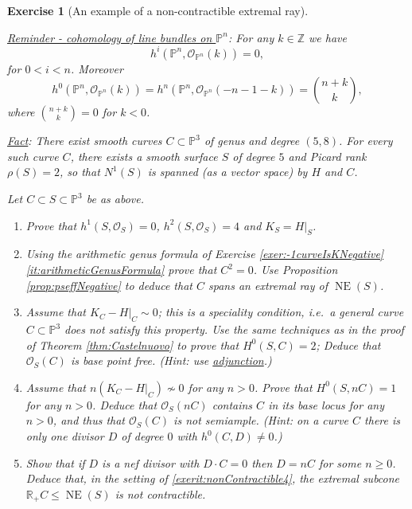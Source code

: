 \documentclass[a4paper,11pt]{amsart}
\newtheorem{exercise}[theorem]{Exercise}
\def\NE{\operatorname{NE}}
\newcommand{\OO}{\mathcal{O}}
\newcommand{\ZZ}{\mathbb{Z}}
\newcommand{\RR}{\mathbb{R}}
\newcommand{\PP}{\mathbb{P}}
\begin{document}
\begin{exercise}[An example of a non-contractible extremal ray]\label{exer:nonSemiample}\leavevmode	
	\begin{center}
		\begin{minipage}{.9\textwidth}
			{\underline{Reminder - \emph{cohomology of line bundles on $\PP^n$}}}:
			For any $k\in \ZZ$ we have
			\[
			h^i(\PP^n,\OO_{\PP^n}(k)) = 0,
			\]
			for $0<i<n$.
			Moreover 
			\[
			h^0(\PP^n,\OO_{\PP^n}(k))= h^n(\PP^n,\OO_{\PP^n}(-n-1-k)) = \binom{n+k}{k},
			\] 
			where $\binom{n+k}{k} = 0$ for $k<0$.
		\end{minipage}
	\end{center}
	\begin{center}
		\begin{minipage}{.9\textwidth}
			{\underline{Fact}}:
			There exist smooth curves $C \subset \PP^3$ of genus and degree $(5,8)$.
			For every such curve $C$, there exists a smooth surface $S$ of degree $5$ and Picard rank $\rho(S) = 2$, so that $N^1(S)$ is spanned (as a vector space) by $H$ and $C$.
		\end{minipage}
	\end{center}
	
	Let $C \subset S \subset \PP^3$ be as above.
	\begin{enumerate}
		\item Prove that $h^1(S,\OO_S) = 0$, $h^2(S,\OO_S) = 4$ and $K_S = H|_S$.
		\item Using the arithmetic genus formula of Exercise \ref{exer:-1curveIsKNegative}\eqref{it:arithmeticGenusFormula} prove that $C^2 = 0$.
		Use Proposition \ref{prop:pseffNegative} to deduce that $C$ spans an extremal ray of $\NE(S)$.
		
		\item Assume that $K_C - H|_C \sim 0$; this is a speciality condition, i.e.\ a general curve $C \subset \PP^3$ does not satisfy this property.
		Use the same techniques as in the proof of Theorem \ref{thm:Castelnuovo} to prove that $H^0(S,C) = 2$;
		Deduce that $\OO_S(C)$ is base point free.
		{\small (Hint: use \hyperref[rem:adjunction]{adjunction}.)}
		\item\label{exerit:nonContractible4} Assume that $n(K_C - H|_C) \not\sim 0$ for any $n > 0$.
		Prove that $H^0(S,nC) = 1$ for any $n > 0$.
		Deduce that $\OO_S(nC)$ contains $C$ in its base locus for any $n>0$, and thus that $\OO_S(C)$ is not semiample.
		{\small (Hint: on a curve $C$ there is only one divisor $D$ of degree $0$ with $h^0(C,D)\neq 0$.)}		
		\item Show that if $D$ is a nef divisor with $D\cdot C = 0$ then $D = nC$ for some $n \geq 0$.
		Deduce that, in the setting of \eqref{exerit:nonContractible4}, the extremal subcone $\RR_+ C \leq \NE(S)$ is \emph{not contractible}.
	\end{enumerate}	
\end{exercise}
\end{document}
